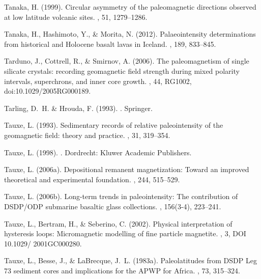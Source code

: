 Tanaka, H. (1999).
\newblock Circular asymmetry of the paleomagnetic directions observed at low
  latitude volcanic sites.
, 51, 1279--1286.

Tanaka, H., Hashimoto, Y., \& Morita, N. (2012).
\newblock Palaeointensity determinations from historical and Holocene basalt
  lavas in Iceland.
, 189, 833--845.

Tarduno, J., Cottrell, R., \& Smirnov, A. (2006).
\newblock The paleomagnetism of single silicate crystals: recording geomagnetic
  field strength during mixed polarity intervals, superchrons, and inner core
  growth.
, 44, RG1002, doi:10.1029/2005RG000189.

Tarling, D.~H. \& Hrouda, F. (1993).
.
\newblock Springer.

Tauxe, L. (1993).
\newblock Sedimentary records of relative paleointensity of the geomagnetic
  field: theory and practice.
, 31, 319--354.

Tauxe, L. (1998).
.
\newblock Dordrecht: Kluwer Academic Publishers.

Tauxe, L. (2006a).
\newblock Depositional remanent magnetization: Toward an improved theoretical
  and experimental foundation.
, 244, 515--529.

Tauxe, L. (2006b).
\newblock Long-term trends in paleointensity: The contribution of DSDP/ODP
  submarine basaltic glass collections.
, 156(3-4), 223--241.

Tauxe, L., Bertram, H., \& Seberino, C. (2002).
\newblock Physical interpretation of hysteresis loops: Micromagnetic modelling
  of fine particle magnetite.
, 3, DOI 10.1029/ 2001GC000280.

Tauxe, L., Besse, J., \& LaBrecque, J.~L. (1983a).
\newblock Paleolatitudes from DSDP Leg 73 sediment cores and implications for
  the APWP for Africa.
, 73, 315--324.


